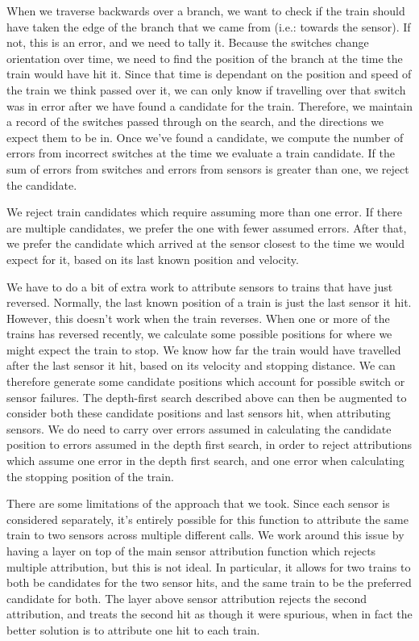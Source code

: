\documentclass{article}
\begin{document}
When we traverse backwards over a branch, we want to check if the train should have taken the
edge of the branch that we came from (i.e.: towards the sensor).
If not, this is an error, and we need to tally it.
Because the switches change orientation over time, we need to find the position of the branch
at the time the train would have hit it.
Since that time is dependant on the position and speed of the train we think passed over it,
we can only know if travelling over that switch was in error after we have found a candidate for the train.
Therefore, we maintain a record of the switches passed through on the search,
and the directions we expect them to be in.
Once we've found a candidate, we compute the number of errors from incorrect switches
at the time we evaluate a train candidate.
If the sum of errors from switches and errors from sensors is greater than one, we reject the
candidate.

We reject train candidates which require assuming more than one error.
If there are multiple candidates, we prefer the one with fewer assumed errors.
After that, we prefer the candidate which arrived at the sensor closest to the time
we would expect for it, based on its last known position and velocity.

We have to do a bit of extra work to attribute sensors to trains that have just reversed.
Normally, the last known position of a train is just the last sensor it hit.
However, this doesn't work when the train reverses.
When one or more of the trains has reversed recently, we calculate some possible positions for where
we might expect the train to stop.
We know how far the train would have travelled after the last sensor it hit, based on its velocity and stopping
distance.
We can therefore generate some candidate positions which account for possible switch or sensor failures.
The depth-first search described above can then be augmented to consider both these candidate positions and
last sensors hit, when attributing sensors.
We do need to carry over errors assumed in calculating the candidate position to errors assumed in
the depth first search, in order to reject attributions which assume one error in the depth first search,
and one error when calculating the stopping position of the train.

There are some limitations of the approach that we took.
Since each sensor is considered separately, it's entirely possible for this
function to attribute the same train to two sensors across multiple different calls.
We work around this issue by having a layer on top of the main sensor attribution
function which rejects multiple attribution, but this is not ideal.
In particular, it allows for two trains to both be candidates for the two sensor
hits, and the same train to be the preferred candidate for both.
The layer above sensor attribution rejects the second attribution,
and treats the second hit as though it were spurious,
when in fact the better solution is to attribute one hit to each train.
\end{document}

